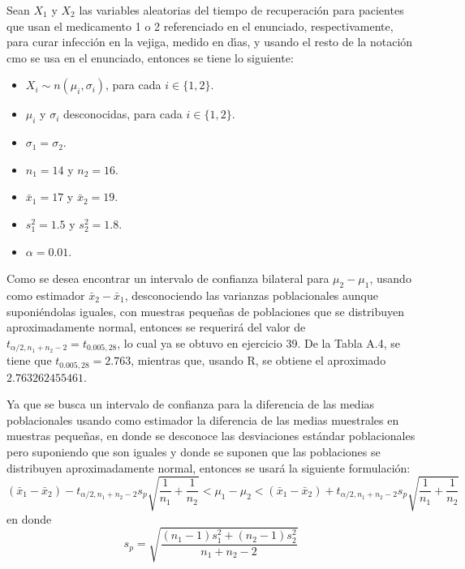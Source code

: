 \begin{solucion}
 Sean $X_1$ y $X_2$ las variables aleatorias del tiempo de recuperaci\'on para pacientes que usan el medicamento 1 o 2 referenciado en el enunciado, respectivamente, para curar infecci\'on en la vejiga, medido en d\'{\i}as, y usando el resto de la notaci\'on cmo se usa en el enunciado, entonces se tiene lo siguiente:
 \begin{itemize}
  \item $X_i \sim n(\mu_i, \sigma_i)$, para cada $i \in \{ 1, 2 \}$.
  \item $\mu_i$ y $\sigma_i$ desconocidas, para cada $i \in \{ 1, 2 \}$.
  \item $\sigma_1 = \sigma_2$.
  \item $n_1 = 14$ y $n_2 = 16$.
  \item $\bar{x}_1 = 17$ y $\bar{x}_2 = 19$.
  \item $s_1^2 = 1.5$ y $s_2^2 = 1.8$.
  \item $\alpha = 0.01$.
 \end{itemize}
 Como se desea encontrar un intervalo de confianza bilateral para $\mu_2 - \mu_1$, usando como estimador $\bar{x}_2 - \bar{x}_1$, desconociendo las varianzas poblacionales aunque suponi\'endolas iguales, con muestras peque\~nas de poblaciones que se distribuyen aproximadamente normal, entonces se requerir\'a del valor de $t_{\alpha/2,n_1+n_2-2} = t_{0.005,28}$, lo cual ya se obtuvo en ejercicio 39. De la Tabla A.4, se tiene que $t_{0.005,28} = 2.763$, mientras que, usando R, se obtiene el aproximado $2.763262455461$.
 \par 
 Ya que se busca un intervalo de confianza para la diferencia de las medias poblacionales usando como estimador la diferencia de las medias muestrales en muestras peque\~nas, en donde se desconoce las desviaciones est\'andar poblacionales pero suponiendo que son iguales y donde se suponen que las poblaciones se distribuyen aproximadamente normal, entonces se usar\'a la siguiente formulaci\'on:
 \begin{equation*}
  \left( \bar{x}_1 - \bar{x}_2  \right) - t_{\alpha/2,n_1+n_2-2}s_p \sqrt{\frac{1}{n_1} + \frac{1}{n_2}} < \mu_1 - \mu_2 < \left( \bar{x}_1 - \bar{x}_2  \right) + t_{\alpha/2,n_1+n_2-2}s_p \sqrt{\frac{1}{n_1} + \frac{1}{n_2}}
 \end{equation*}
 en donde
 \begin{equation*}
  s_p = \sqrt{\frac{\left( n_1-1 \right)s_1^2 + \left( n_2 - 1 \right)s_2^2}{n_1 + n_2 - 2}}
 \end{equation*}

\end{solucion}
